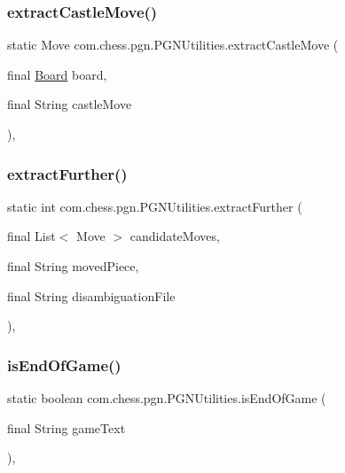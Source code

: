 \subsubsection{\texorpdfstring{extractCastleMove()}{extractCastleMove()}}
{\footnotesize\ttfamily static Move com.\+chess.\+pgn.\+P\+G\+N\+Utilities.\+extract\+Castle\+Move (\begin{DoxyParamCaption}\item[{final \mbox{\hyperlink{classcom_1_1chess_1_1engine_1_1classic_1_1board_1_1_board}{Board}}}]{board,  }\item[{final String}]{castle\+Move }\end{DoxyParamCaption})\hspace{0.3cm}{\ttfamily [static]}, {\ttfamily [private]}}

\mbox{\label{classcom_1_1chess_1_1pgn_1_1_p_g_n_utilities_a92202124e617f80bcf023005c5310d55}} 
\subsubsection{\texorpdfstring{extractFurther()}{extractFurther()}}
{\footnotesize\ttfamily static int com.\+chess.\+pgn.\+P\+G\+N\+Utilities.\+extract\+Further (\begin{DoxyParamCaption}\item[{final List$<$ Move $>$}]{candidate\+Moves,  }\item[{final String}]{moved\+Piece,  }\item[{final String}]{disambiguation\+File }\end{DoxyParamCaption})\hspace{0.3cm}{\ttfamily [static]}, {\ttfamily [private]}}

\mbox{\label{classcom_1_1chess_1_1pgn_1_1_p_g_n_utilities_a4d719226070370ffee5c7380f9846318}} 
\subsubsection{\texorpdfstring{isEndOfGame()}{isEndOfGame()}}
{\footnotesize\ttfamily static boolean com.\+chess.\+pgn.\+P\+G\+N\+Utilities.\+is\+End\+Of\+Game (\begin{DoxyParamCaption}\item[{final String}]{game\+Text }\end{DoxyParamCaption})\hspace{0.3cm}{\ttfamily [static]}, {\ttfamily [private]}}

